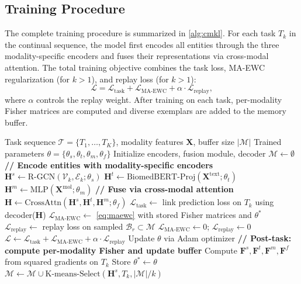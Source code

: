 \subsection{Training Procedure}
\label{subsec:training}

The complete \ours training procedure is summarized in \cref{alg:cmkl}.
For each task $T_k$ in the continual sequence, the model first encodes all entities through the three modality-specific encoders and fuses their representations via cross-modal attention.
The total training objective combines the task loss, MA-EWC regularization (for $k > 1$), and replay loss (for $k > 1$):
\begin{equation}
    \mathcal{L} = \mathcal{L}_{\text{task}} + \mathcal{L}_{\text{MA-EWC}} + \alpha \cdot \mathcal{L}_{\text{replay}},
    \label{eq:total}
\end{equation}
where $\alpha$ controls the replay weight.
After training on each task, per-modality Fisher matrices are computed and diverse exemplars are added to the memory buffer.

\begin{algorithm}[t]
\caption{\ours Training Procedure}
\label{alg:cmkl}
\begin{algorithmic}[1]
\REQUIRE Task sequence $\mathcal{T} = \{T_1, \ldots, T_K\}$, modality features $\mathbf{X}$, buffer size $|\mathcal{M}|$
\ENSURE Trained parameters $\theta = \{\theta_s, \theta_t, \theta_m, \theta_f\}$
\STATE Initialize encoders, fusion module, decoder
\STATE $\mathcal{M} \leftarrow \emptyset$ 
    \STATE \textbf{// Encode entities with modality-specific encoders}
    \STATE $\mathbf{H}^s \leftarrow \text{R-GCN}(\mathcal{V}_k, \mathcal{E}_k; \theta_s)$
    \STATE $\mathbf{H}^t \leftarrow \text{BiomedBERT-Proj}(\mathbf{X}^{\text{text}}; \theta_t)$
    \STATE $\mathbf{H}^m \leftarrow \text{MLP}(\mathbf{X}^{\text{mol}}; \theta_m)$
    \STATE \textbf{// Fuse via cross-modal attention}
    \STATE $\mathbf{H} \leftarrow \text{CrossAttn}(\mathbf{H}^s, \mathbf{H}^t, \mathbf{H}^m; \theta_f)$
        \STATE $\mathcal{L}_{\text{task}} \leftarrow$ link prediction loss on $T_k$ using decoder($\mathbf{H}$)
            \STATE $\mathcal{L}_{\text{MA-EWC}} \leftarrow$ \cref{eq:maewc} with stored Fisher matrices and $\theta^*$
            \STATE $\mathcal{L}_{\text{replay}} \leftarrow$ replay loss on sampled $\mathcal{B}_r \subset \mathcal{M}$
        \ELSE
            \STATE $\mathcal{L}_{\text{MA-EWC}} \leftarrow 0$; $\mathcal{L}_{\text{replay}} \leftarrow 0$
        \ENDIF
        \STATE $\mathcal{L} \leftarrow \mathcal{L}_{\text{task}} + \mathcal{L}_{\text{MA-EWC}} + \alpha \cdot \mathcal{L}_{\text{replay}}$
        \STATE Update $\theta$ via Adam optimizer
    \ENDFOR
    \STATE \textbf{// Post-task: compute per-modality Fisher and update buffer}
    \STATE Compute $\mathbf{F}^s, \mathbf{F}^t, \mathbf{F}^m, \mathbf{F}^f$ from squared gradients on $T_k$
    \STATE Store $\theta^* \leftarrow \theta$
    \STATE $\mathcal{M} \leftarrow \mathcal{M} \cup \text{K-means-Select}(\mathbf{H}^s, T_k, |\mathcal{M}|/k)$
\ENDFOR
\end{algorithmic}
\end{algorithm}
